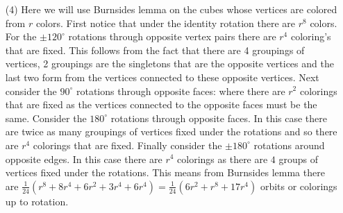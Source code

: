 \documentclass[12pt]{amsart}
\begin{document}
\begin{itemize}
\item[(4)] %
Here we will use Burnsides lemma on the cubes whose vertices are colored from $r$ colors. First notice that under the identity rotation there are $r^{8}$ colors. For the $\pm 120^\circ$ rotations through opposite vertex pairs there are $r^4$ coloring's that are fixed. This follows from the fact that there are 4 groupings of vertices, 2 groupings are the singletons that are the opposite vertices and the last two form from the vertices connected to these opposite vertices. Next consider the $90^\circ$ rotations through opposite faces: where there are $r^2$ colorings that are fixed as the vertices connected to the opposite faces must be the same. Consider the $180^\circ$ rotations through opposite faces. In this case there are twice as many groupings of vertices fixed under the rotations and so there are $r^{4}$ colorings that are fixed. Finally consider the $\pm 180^\circ$ rotations around opposite edges. In this case there are $r^4$ colorings as there are $4$ groups of vertices fixed under the rotations. This means from Burnsides lemma there are $\frac{1}{24}(r^{8}+8r^4+6r^2+3r^4+6r^4)=\frac{1}{24}(6r^2+r^{8}+17r^4)$ orbits or colorings up to rotation.\\




\end{itemize}
\end{document}

